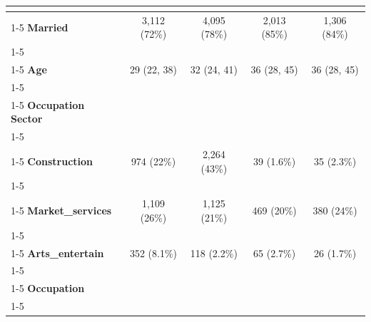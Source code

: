 \begin{table}[!h]
\begin{tabular}[t]{>{}l|c|c|c|c}
\textbf{\cellcolor{gray!10}{Female}} & \cellcolor{gray!10}{991 (23\%)} & \cellcolor{gray!10}{1,079 (20\%)} & \cellcolor{gray!10}{536 (23\%)} & \cellcolor{gray!10}{433 (28\%)}\\
\cline{1-5}
\textbf{Married} & 3,112 (72\%) & 4,095 (78\%) & 2,013 (85\%) & 1,306 (84\%)\\
\cline{1-5}
\textbf{\cellcolor{gray!10}{Urban}} & \cellcolor{gray!10}{3,068 (71\%)} & \cellcolor{gray!10}{3,426 (65\%)} & \cellcolor{gray!10}{1,786 (75\%)} & \cellcolor{gray!10}{1,150 (74\%)}\\
\cline{1-5}
\textbf{Age} & 29 (22, 38) & 32 (24, 41) & 36 (28, 45) & 36 (28, 45)\\
\cline{1-5}
\textbf{\cellcolor{gray!10}{Experience}} & \cellcolor{gray!10}{15 (8, 27)} & \cellcolor{gray!10}{18 (8, 30)} & \cellcolor{gray!10}{17 (10, 27)} & \cellcolor{gray!10}{17 (8, 28)}\\
\cline{1-5}
\textbf{Occupation Sector} &  &  &  & \\
\cline{1-5}
\textbf{\cellcolor{gray!10}{Mining\_utility}} & \cellcolor{gray!10}{114 (2.6\%)} & \cellcolor{gray!10}{150 (2.8\%)} & \cellcolor{gray!10}{71 (3.0\%)} & \cellcolor{gray!10}{53 (3.4\%)}\\
\cline{1-5}
\textbf{Construction} & 974 (22\%) & 2,264 (43\%) & 39 (1.6\%) & 35 (2.3\%)\\
\cline{1-5}
\textbf{\cellcolor{gray!10}{Manufacturing}} & \cellcolor{gray!10}{1,220 (28\%)} & \cellcolor{gray!10}{782 (15\%)} & \cellcolor{gray!10}{263 (11\%)} & \cellcolor{gray!10}{126 (8.1\%)}\\
\cline{1-5}
\textbf{Market\_services} & 1,109 (26\%) & 1,125 (21\%) & 469 (20\%) & 380 (24\%)\\
\cline{1-5}
\textbf{\cellcolor{gray!10}{Non\_Market\_services}} & \cellcolor{gray!10}{570 (13\%)} & \cellcolor{gray!10}{833 (16\%)} & \cellcolor{gray!10}{1,472 (62\%)} & \cellcolor{gray!10}{935 (60\%)}\\
\cline{1-5}
\textbf{Arts\_entertain} & 352 (8.1\%) & 118 (2.2\%) & 65 (2.7\%) & 26 (1.7\%)\\
\cline{1-5}
\textbf{\cellcolor{gray!10}{Migrated For Job}} & \cellcolor{gray!10}{1,260 (29\%)} & \cellcolor{gray!10}{620 (12\%)} & \cellcolor{gray!10}{920 (39\%)} & \cellcolor{gray!10}{338 (22\%)}\\
\cline{1-5}
\textbf{Occupation} &  &  &  & \\
\cline{1-5}
\textbf{\cellcolor{gray!10}{Elementary\_occupations}} & \cellcolor{gray!10}{1,020 (24\%)} & \cellcolor{gray!10}{1,711 (32\%)} & \cellcolor{gray!10}{262 (11\%)} & \cellcolor{gray!10}{132 (8.5\%)}\\

\end{tabular}
\end{table}
